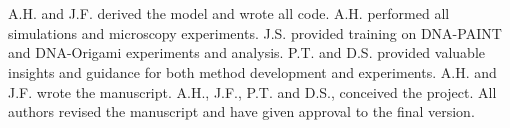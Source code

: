 \section{}
A.H. and J.F. derived the model and wrote all code.
%
A.H. performed all simulations and microscopy experiments. 
%
J.S. provided training on DNA-PAINT and DNA-Origami experiments and analysis.
%
P.T. and D.S. provided valuable insights and guidance for both method development and experiments.
%
A.H. and J.F. wrote the manuscript.
%
A.H., J.F., P.T. and D.S., conceived the project.
%
All authors revised the manuscript and have given approval to the final version.